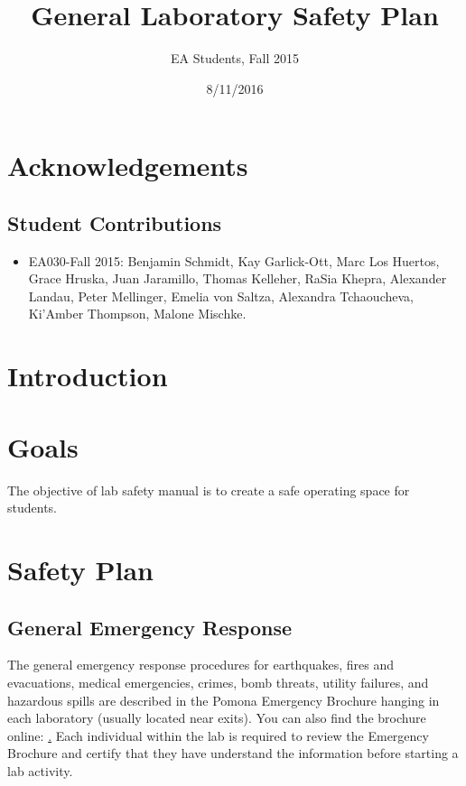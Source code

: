 \documentclass[12pt]{../SOP2}
\title{General Laboratory Safety Plan}
\date{8/11/2016}
\author{EA Students, Fall 2015}
\begin{document}


\maketitle

\section{Acknowledgements}

\subsection{Student Contributions}

\begin{itemize}
  \item EA030-Fall 2015: Benjamin Schmidt, Kay Garlick-Ott, Marc Los Huertos, Grace Hruska, Juan Jaramillo, Thomas Kelleher, RaSia Khepra, Alexander Landau, Peter Mellinger, Emelia von Saltza, Alexandra Tchaoucheva, Ki'Amber Thompson, Malone Mischke.
\end{itemize}

\tableofcontents

\newpage

\section{Introduction}

\section{Goals}

\NP The objective of lab safety manual is to create a safe operating space for students.

\section{Safety Plan}

\subsection{General Emergency Response}

\NP The general emergency response procedures for earthquakes, fires and evacuations, medical emergencies, crimes, bomb threats, utility failures, and hazardous spills are described in the Pomona Emergency Brochure hanging in each laboratory (usually located near exits). You can also find the brochure online: \href{http://www.pomona.edu/sites/default/files/emergency-instructions.pdf}. Each individual within the lab is required to review the Emergency Brochure and certify that they have understand the information before starting a lab activity.
\end{document}
